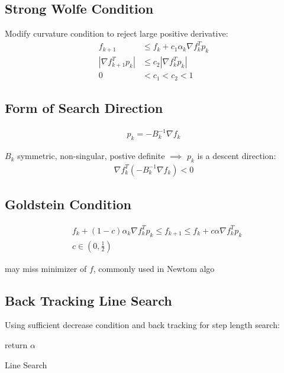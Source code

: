 \documentclass[8pt,letter]{article}
\begin{document}
\begin{multicols*}{2}
\begin{itemize}
  \end{itemize}
  
  \subsection{Strong Wolfe Condition}
  
  Modify curvature condition to reject large positive derivative:
  \begin{align}
    f_{k+1} & \leq f_k + c_1 \alpha_k \nabla f_k^T p_k\\
    | \nabla f_{k+1}^T p_k| & \leq c_2 |\nabla f_k^T p_k|\\
    0 & < c_1 < c_2 < 1
  \end{align}
  
  \subsection{Form of Search Direction}
  
  \begin{align}
    p_k = - B_k^{-1} \nabla f_k
  \end{align}
  
  $B_k$ symmetric, non-singular, postive definite $\implies$ $p_k$ is a descent direction:
  \begin{align}
    \nabla f_k^T(-B_k^{-1} \nabla f_k) < 0
  \end{align}

  \subsection{Goldstein Condition}
  
  \begin{align*}
    &f_k+(1-c) \alpha_k \nabla f_k^T p_k \leq f_{k+1} \leq f_k + c \alpha \nabla f_k^T p_k\\
    &c \in (0,\frac{1}{2})
  \end{align*}

  may miss minimizer of $f$, commonly used in Newtom algo

  \subsection{Back Tracking Line Search}

  Using sufficient decrease condition and back tracking for step length search:

  \begin{algorithm}[H]
    return $\alpha$
    \caption{Line Search\label{Algo_LineSearch}}
  \end{algorithm}
  


\end{multicols*}
\end{document}
